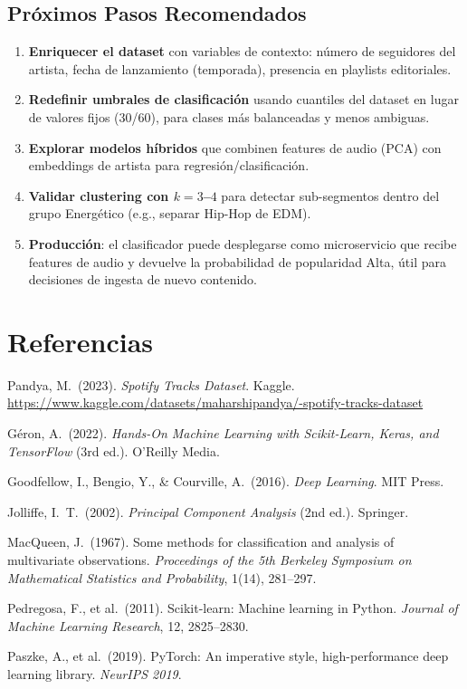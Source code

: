 \documentclass[12pt,a4paper]{article}
\begin{document}
\subsection{Pr\'oximos Pasos Recomendados}

\begin{enumerate}[noitemsep]
  \item \textbf{Enriquecer el dataset} con variables de contexto: n\'umero de seguidores del
    artista, fecha de lanzamiento (temporada), presencia en playlists editoriales.
  \item \textbf{Redefinir umbrales de clasificaci\'on} usando cuantiles del dataset en lugar
    de valores fijos (30/60), para clases m\'as balanceadas y menos ambiguas.
  \item \textbf{Explorar modelos h\'ibridos} que combinen features de audio (PCA) con
    embeddings de artista para regresi\'on/clasificaci\'on.
  \item \textbf{Validar clustering con $k=3$--$4$} para detectar sub-segmentos dentro del
    grupo Energ\'etico (e.g., separar Hip-Hop de EDM).
  \item \textbf{Producci\'on}: el clasificador puede desplegarse como microservicio que
    recibe features de audio y devuelve la probabilidad de popularidad Alta, \'util para
    decisiones de ingesta de nuevo contenido.
\end{enumerate}

\newpage
\section*{Referencias}

\begin{enumerate}[leftmargin=*, label={[\arabic*]}]
  \item Pandya, M.\ (2023). \textit{Spotify Tracks Dataset}. Kaggle.
    \url{https://www.kaggle.com/datasets/maharshipandya/-spotify-tracks-dataset}
  \item G\'eron, A.\ (2022). \textit{Hands-On Machine Learning with Scikit-Learn, Keras,
    and TensorFlow} (3rd ed.). O'Reilly Media.
  \item Goodfellow, I., Bengio, Y., \& Courville, A.\ (2016). \textit{Deep Learning}.
    MIT Press.
  \item Jolliffe, I.\ T.\ (2002). \textit{Principal Component Analysis} (2nd ed.). Springer.
  \item MacQueen, J.\ (1967). Some methods for classification and analysis of multivariate
    observations. \textit{Proceedings of the 5th Berkeley Symposium on Mathematical
    Statistics and Probability}, 1(14), 281--297.
  \item Pedregosa, F., et al.\ (2011). Scikit-learn: Machine learning in Python.
    \textit{Journal of Machine Learning Research}, 12, 2825--2830.
  \item Paszke, A., et al.\ (2019). PyTorch: An imperative style, high-performance deep
    learning library. \textit{NeurIPS 2019}.
\end{enumerate}
\end{document}
